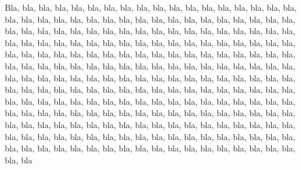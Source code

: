 Bla, bla, bla, bla, bla, bla, bla, bla, bla, bla, bla, bla, bla, bla, bla, bla, bla, bla, bla, bla, bla, bla, bla, bla, bla, bla, bla, bla, bla, bla, bla, bla, bla, bla, bla, bla, bla, bla, bla, bla, bla, bla, bla, bla, bla, bla, bla, bla, bla, bla, bla, bla, bla, bla, bla, bla, bla, bla, bla, bla, bla, bla, bla, bla, bla, bla, bla, bla, bla, bla, bla, bla, bla, bla, bla, bla, bla, bla, bla, bla, bla, bla, bla, bla, bla, bla, bla, bla, bla, bla, bla, bla, bla, bla, bla, bla, bla, bla, bla, bla, bla, bla, bla, bla, bla, bla, bla, bla, bla, bla, bla, bla, bla, bla, bla, bla, bla, bla, bla, bla, bla, bla, bla, bla, bla, bla, bla, bla, bla, bla, bla, bla, bla, bla, bla, bla, bla, bla, bla, bla, bla, bla, bla, bla, bla, bla, bla, bla, bla, bla, bla, bla, bla, bla, bla, bla, bla, bla, bla, bla, bla, bla, bla, bla, bla, bla, bla, bla, bla, bla, bla, bla, bla, bla, bla, bla, bla, bla, bla, bla, bla, bla, bla, bla, bla, bla, bla, bla, bla, bla, bla, bla, bla, bla, bla, bla, bla, bla, bla, bla, bla, bla, bla, bla, bla, bla, bla, bla, bla, bla, bla, bla, bla, bla, bla, bla, bla, bla, bla, bla, bla, bla, bla, bla, bla, bla, bla, bla, bla, bla, bla, bla, bla, bla, bla, bla
